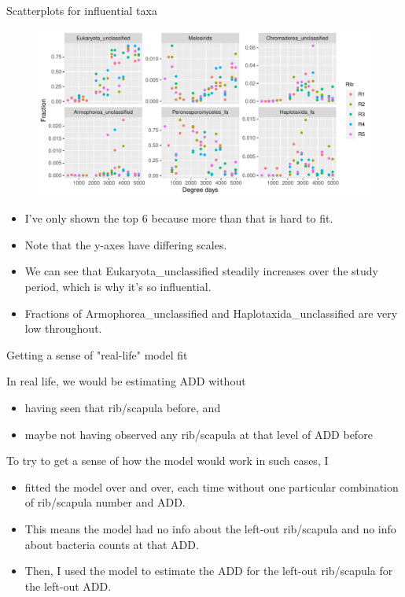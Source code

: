 \documentclass{beamer}
\begin{document}
\begin{frame}{Scatterplots for influential taxa}

  \begin{center}
    \begin{figure}
      \includegraphics[width=4.5in]{w_ribs/infl_rib_family_scatter}
    \end{figure}
  \end{center}
  \vspace{-0.2in}
  {\scriptsize
  \begin{itemize}
  \item I've only shown the top 6 because more than that is hard to fit.
  \item Note that the y-axes have differing scales.
  \item We can see that Eukaryota\_unclassified steadily increases over the
  study period, which is why it's so influential.
  \item Fractions of Armophorea\_unclassified and Haplotaxida\_unclassified are
  very low throughout.
  \end{itemize}
  }

\end{frame}



\begin{frame}{Getting a sense of "real-life" model fit}

  \noindent In real life, we would be estimating ADD without
  \begin{itemize}
    \item having seen that rib/scapula before, and
    \item maybe not having observed any rib/scapula at that level of ADD before
  \end{itemize} 

  \vspace{0.1in}

  \noindent To try to get a sense of how the model would work in such cases, I
  \begin{itemize}
    \item fitted the model over and over, each time without one particular
    combination of rib/scapula number and ADD.
    \item This means the model had no info about the left-out rib/scapula and no
    info about bacteria counts at that ADD.
    \item Then, I used the model to estimate the ADD for the left-out
    rib/scapula for the left-out ADD.
  \end{itemize}
  
\end{frame}
\end{document}
